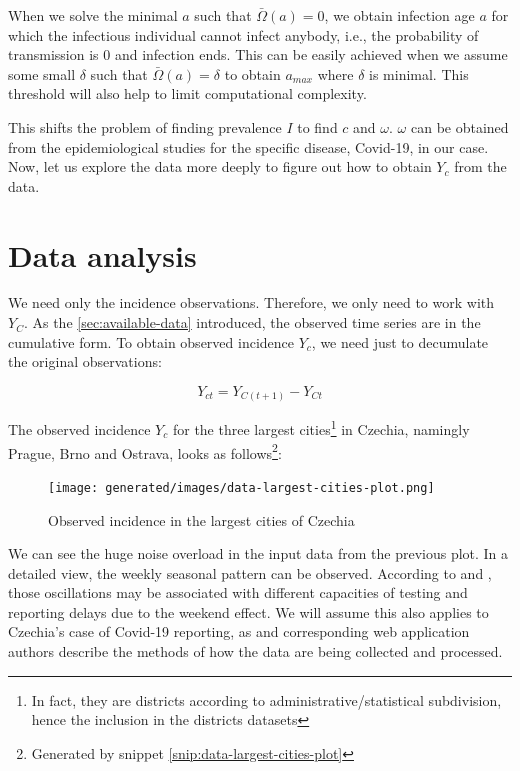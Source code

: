 \documentclass[
  digital, %
  oneside, %
  lof,     %
  lot,     %
]{fithesis4}
\begin{document}
When we solve the minimal $a$ such that $\bar{\Omega}(a) = 0$, we obtain infection age $a$ for which the infectious individual cannot infect anybody, i.e., the probability of transmission is $0$ and infection ends.
This can be easily achieved when we assume some small $\delta$ such that $\bar{\Omega}(a) = \delta$ to obtain $a_{max}$ where $\delta$ is minimal.
This threshold will also help to limit computational complexity.

This shifts the problem of finding prevalence $I$ to find $c$ and $\omega$. $\omega$ can be obtained from the epidemiological studies for the specific disease, Covid-19, in our case.
Now, let us explore the data more deeply to figure out how to obtain $Y_c$ from the data.


\section{Data analysis}

We need only the incidence observations. Therefore, we only need to work with $Y_C$.
As the \autoref{sec:available-data} introduced, the observed time series are in the cumulative form.
To obtain observed incidence $Y_c$, we need just to decumulate the original observations:

\begin{equation}
  Y_{ct} = Y_{C(t + 1)} - Y_{Ct}
\end{equation}

The observed incidence $Y_c$ for the three largest 
cities\footnote{In fact, they are districts according to 
administrative/statistical subdivision, hence the inclusion in the districts datasets} in Czechia, 
namingly Prague, Brno and Ostrava, looks as 
follows\footnote{Generated by snippet 
\ref{snip:data-largest-cities-plot}}:

\begin{figure}[H]
  \begin{center}
    \texttt{[image: generated/images/data-largest-cities-plot.png]}
  \end{center}
  \caption{Observed incidence in the largest cities of Czechia}
  \label{fig:largest-cities-incidence}
\end{figure}

We can see the huge noise overload in the input data from the previous plot. 
In a detailed view, the weekly seasonal pattern can be observed. 
According to \cite{liu2021} and \cite{annunziato2020}, those oscillations may be associated with different capacities of testing and reporting delays due to the weekend effect. 
We will assume this also applies to Czechia's case of Covid-19 reporting, as \cite{komenda2020} and corresponding web application authors describe the methods of how the data are being collected and processed.
\end{document}
